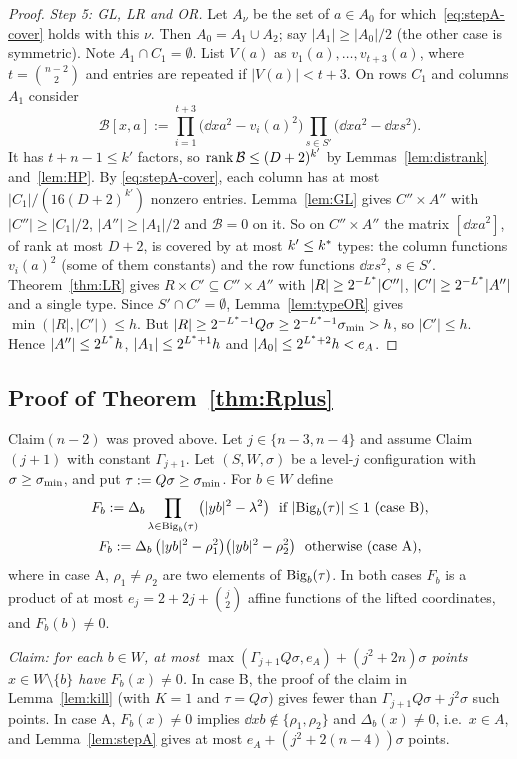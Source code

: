 \begin{proof}
\emph{Step 5: GL, LR and OR.} Let $A_\nu$ be the set of $a\in A_0$ for which~\eqref{eq:stepA-cover} holds with this
$\nu$. Then $A_0=A_1\cup A_2$; say $|A_1|\ge|A_0|/2$ (the other case is symmetric). Note $A_1\cap C_1=\emptyset$.
List $V(a)$ as $v_1(a),\dots,v_{t+3}(a)$, where $t=\binom{n-2}2$ and entries are repeated if $|V(a)|<t+3$. On rows
$C_1$ and columns $A_1$ consider
\[
\mathcal B[x,a]:=\prod_{i=1}^{t+3}\bigl(\dd xa^2-v_i(a)^2\bigr)\prod_{s\in S'}\bigl(\dd xa^2-\dd xs^2\bigr).
\]
It has $t+n-1\le k'$ factors, so $\operatorname{rank}\mathcal B\le(D+2)^{k'}$ by Lemmas~\ref{lem:distrank} and~\ref{lem:HP}. By
\eqref{eq:stepA-cover}, each column has at most $|C_1|/(16(D+2)^{k'})$ nonzero entries. Lemma~\ref{lem:GL} gives
$C''\times A''$ with $|C''|\ge|C_1|/2$, $|A''|\ge|A_1|/2$ and $\mathcal B=0$ on it. So on $C''\times A''$ the matrix
$[\dd xa^2]$, of rank at most $D+2$, is covered by at most $k'\le k^{\ast}$ types: the column functions $v_i(a)^2$ (some of
them constants) and the row functions $\dd xs^2$, $s\in S'$. Theorem~\ref{thm:LR} gives $R\times C'\subseteq C''\times A''$
with $|R|\ge2^{-L^{\ast}}|C''|$, $|C'|\ge2^{-L^{\ast}}|A''|$ and a single type. Since $S'\cap C'=\emptyset$,
Lemma~\ref{lem:typeOR} gives $\min(|R|,|C'|)\le h$. But
$|R|\ge2^{-L^{\ast}-1}Q\sigma\ge2^{-L^{\ast}-1}\sigma_{\min}>h$, so $|C'|\le h$. Hence $|A''|\le2^{L^{\ast}}h$, $|A_1|\le2^{L^{\ast}+1}h$ and
$|A_0|\le2^{L^{\ast}+2}h<e_A$.
\end{proof}

\subsection{Proof of Theorem~\ref{thm:Rplus}}
Claim$(n-2)$ was proved above. Let $j\in\{n-3,n-4\}$ and assume Claim$(j+1)$ with constant $\Gamma_{j+1}$. Let
$(S,W,\sigma)$ be a level-$j$ configuration with $\sigma\ge\sigma_{\min}$, and put $\tau:=Q\sigma\ge\sigma_{\min}$. For $b\in W$ define
\begin{gather*}
F_b:=\Delta_b\prod_{\lambda\in\mathrm{Big}_b(\tau)}\bigl(|yb|^2-\lambda^2\bigr)\ \text{ if }|\mathrm{Big}_b(\tau)|\le1\ \text{(case B)},\\
F_b:=\Delta_b\,\bigl(|yb|^2-\rho_1^2\bigr)\bigl(|yb|^2-\rho_2^2\bigr)\ \text{ otherwise (case A)},
\end{gather*}
where in case A, $\rho_1\ne\rho_2$ are two elements of $\mathrm{Big}_b(\tau)$. In both cases $F_b$ is a product of at most
$e_j=2+2j+\binom j2$ affine functions of the lifted coordinates, and $F_b(b)\ne0$.

\emph{Claim: for each $b\in W$, at most $\max(\Gamma_{j+1}Q\sigma,e_A)+(j^2+2n)\sigma$ points $x\in W\setminus\{b\}$
have $F_b(x)\ne0$.} In case B, the proof of the claim in Lemma~\ref{lem:kill} (with $K=1$ and $\tau=Q\sigma$) gives
fewer than $\Gamma_{j+1}Q\sigma+j^2\sigma$ such points. In case A, $F_b(x)\ne0$ implies $\dd xb\notin\{\rho_1,\rho_2\}$
and $\Delta_b(x)\ne0$, i.e.\ $x\in A$, and Lemma~\ref{lem:stepA} gives at most $e_A+(j^2+2(n-4))\sigma$ points.

